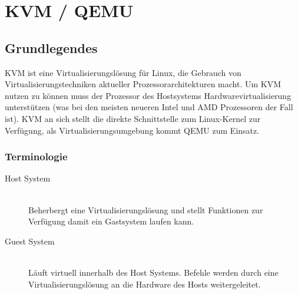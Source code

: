 

\newcommand{\SUBJECT}{Report}
\newcommand{\TITLE}{Cloud Infrastructre Lab 4}










\section{KVM / QEMU}
\subsection{Grundlegendes}
KVM ist eine Virtualisierungslösung für Linux, die Gebrauch von Virtualisierungstechniken aktueller Prozessorarchitekturen macht. Um KVM nutzen zu können muss der Prozessor des Hostsystems Hardwarevirtualisierung unterstützen (was bei den meisten neueren Intel und AMD Prozessoren der Fall ist). KVM an sich stellt die direkte Schnittstelle zum Linux-Kernel zur Verfügung, als Virtualisierungsumgebung kommt QEMU zum Einsatz.

\subsubsection{Terminologie}
\begin{description}
	\item[Host System] \hfill \\
	Beherbergt eine Virtualisierungslösung und stellt Funktionen zur Verfügung damit ein Gastsystem laufen kann.
	\item[Guest System] \hfill \\
	Läuft virtuell innerhalb des Host Systems. Befehle werden durch eine Virtualisierungslösung an die Hardware des Hosts weitergeleitet.
\end{description}

